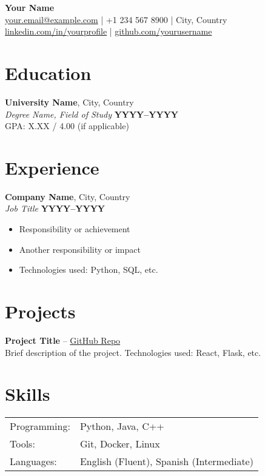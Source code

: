 \documentclass[a4paper,10pt]{article}
\begin{document}
\begin{center}
    {\LARGE \textbf{Your Name}}\\
    \vspace{0.2cm}
    \href{mailto:your.email@example.com}{your.email@example.com} | +1 234 567 8900 | City, Country \\
    \href{https://linkedin.com/in/yourprofile}{linkedin.com/in/yourprofile} | 
    \href{https://github.com/yourusername}{github.com/yourusername}
\end{center}

\vspace{0.5cm}

\section*{Education}
\textbf{University Name}, City, Country \\
\textit{Degree Name, Field of Study} \hfill \textbf{YYYY--YYYY} \\
GPA: X.XX / 4.00 (if applicable)

\vspace{0.3cm}

\section*{Experience}
\textbf{Company Name}, City, Country \\
\textit{Job Title} \hfill \textbf{YYYY--YYYY} \\
\begin{itemize}[leftmargin=1.5em]
    \item Responsibility or achievement
    \item Another responsibility or impact
    \item Technologies used: Python, SQL, etc.
\end{itemize}

\vspace{0.3cm}

\section*{Projects}
\textbf{Project Title} – \href{https://github.com/projectrepo}{GitHub Repo} \\
Brief description of the project. Technologies used: React, Flask, etc.

\vspace{0.3cm}

\section*{Skills}
\begin{tabular}{ll}
    Programming: & Python, Java, C++ \\
    Tools: & Git, Docker, Linux \\
    Languages: & English (Fluent), Spanish (Intermediate)
\end{tabular}
\end{document}
